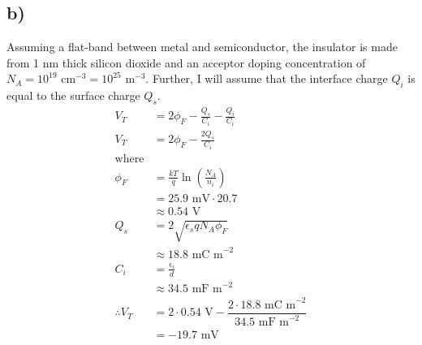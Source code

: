 \subsection*{b)}
Assuming a flat-band between metal and semiconductor, the insulator is made from 1 nm thick silicon dioxide and an acceptor doping concentration of 
$N_A = 10^{19} \textrm{ cm}^{-3} = 10^{25} \textrm{ m}^{-3}$. Further, I will assume that the interface charge $Q_i$ is equal to the surface charge $Q_s$.
\[
\begin{aligned}
	V_T &= 2 \phi_F - \frac{Q_s}{C_i} - \frac{Q_i}{C_i} \\
	V_T &= 2 \phi_F - \frac{2 Q_s}{C_i} \\
	\textrm{where}\\
	\phi_F	&= \frac{k T}{q} \ln \left(\frac{N_A}{n_i}\right) \\
		&= 25.9 \textrm{ mV} \cdot 20.7 \\
		&\approx 0.54 \textrm{ V} \\
	Q_s &= 2\sqrt{\epsilon_s q N_A \phi_F} \\
		&\approx 18.8 \textrm{ mC m}^{-2}\\
	C_i &= \frac{\epsilon_i}{d} \\
		&\approx 34.5 \textrm{ mF m}^{-2} \\
		\therefore V_T &= 2 \cdot 0.54 \textrm{ V} -
		 \dfrac{2 \cdot 18.8  \textrm{ mC m}^{-2}}{34.5 \textrm{ mF m}^{-2}} \\
		 &= -19.7 \textrm{ mV}
\end{aligned}
\]
